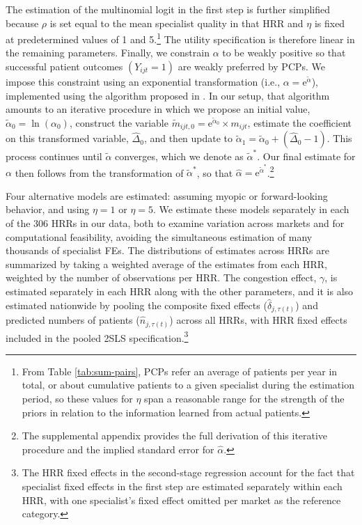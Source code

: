 \documentclass[12pt]{article}
\begin{document}
The estimation of the multinomial logit in the first step is further simplified because $\rho$ is set equal to the mean specialist quality in that HRR and $\eta$ is fixed at predetermined values of 1 and 5.\footnote{From Table \ref{tab:sum-pairs}, PCPs refer an average of \meanRefsPerPCP{} patients per year in total, or about \runningReferrals{} cumulative patients to a given specialist during the estimation period, so these values for $\eta$ span a reasonable range for the strength of the priors in relation to the information learned from actual patients.} The utility specification is therefore linear in the remaining parameters. Finally, we constrain $\alpha$ to be weakly positive so that successful patient outcomes $(Y_{ijt}=1)$ are weakly preferred by PCPs. We impose this constraint using an exponential transformation (i.e., $\alpha = \text{e}^{\tilde \alpha}$), implemented using the algorithm proposed in \cite{fader1992}. In our setup, that algorithm amounts to an iterative procedure in which we propose an initial value, $\tilde \alpha_{0}=\ln (\alpha_0)$, construct the variable $\tilde{m}_{ijt,0}=\text{e}^{\tilde \alpha_{0}} \times m_{ijt}$, estimate the coefficient on this transformed variable, $\widehat{\Delta}_{0}$, and then update to $\tilde \alpha_{1} = \tilde \alpha_{0} + (\widehat{\Delta}_{0} - 1)$. This process continues until $\tilde \alpha$ converges, which we denote as $\tilde \alpha^{*}$. Our final estimate for $\alpha$ then follows from the transformation of $\tilde \alpha^{*}$, so that $\hat{\alpha} = \text{e}^{\tilde \alpha^{*}}$.\footnote{The supplemental appendix provides the full derivation of this iterative procedure and the implied standard error for $\hat\alpha$.}

Four alternative models are estimated: assuming myopic or forward-looking behavior, and using $\eta =1$ or $\eta =5$.
We estimate these models separately in each of the 306 HRRs in our data, both to examine variation across markets and for computational feasibility, avoiding the simultaneous estimation of many thousands of specialist FEs. The distributions of estimates across HRRs are summarized by taking a weighted average of the estimates from each HRR, weighted by the number of observations per HRR. The congestion effect, $\gamma$, is estimated separately in each HRR along with the other parameters, and it is also estimated nationwide by pooling the composite fixed effects ($\hat \delta_{j, \tau(t)}$) and predicted numbers of patients ($\hat n_{j, \tau(t)}$) across all HRRs, with HRR fixed effects included in the pooled 2SLS specification.\footnote{The HRR fixed effects in the second-stage regression account for the fact that specialist fixed effects in the first step are estimated separately within each HRR, with one specialist's fixed effect omitted per market as the reference category.}
\end{document}
